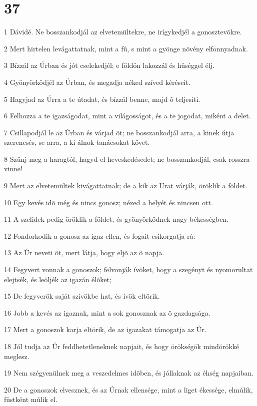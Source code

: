 \chapter{37}

\par 1 Dávidé. Ne bosszankodjál az elvetemültekre, ne irígykedjél a gonosztevõkre.
\par 2 Mert hirtelen levágattatnak, mint a fû, s mint a gyönge növény elfonnyadnak.
\par 3 Bízzál az Úrban és jót cselekedjél; e földön lakozzál és hûséggel élj.
\par 4 Gyönyörködjél az Úrban, és megadja néked szíved kéréseit.
\par 5 Hagyjad az Úrra a te útadat, és bízzál benne, majd õ teljesíti.
\par 6 Felhozza a te igazságodat, mint a világosságot, és a te jogodat, miként a delet.
\par 7 Csillapodjál le az Úrban és várjad õt; ne bosszankodjál arra, a kinek útja szerencsés, se arra, a ki álnok tanácsokat követ.
\par 8 Szünj meg a haragtól, hagyd el heveskedésedet; ne bosszankodjál, csak rosszra vinne!
\par 9 Mert az elvetemültek kivágattatnak; de a kik az Urat várják, öröklik a földet.
\par 10 Egy kevés idõ még és nincs gonosz; nézed a helyét és nincsen ott.
\par 11 A szelidek pedig öröklik a földet, és gyönyörködnek nagy békességben.
\par 12 Fondorkodik a gonosz az igaz ellen, és fogait csikorgatja rá:
\par 13 Az Úr neveti õt, mert látja, hogy eljõ az õ napja.
\par 14 Fegyvert vonnak a gonoszok; felvonják ívöket, hogy a szegényt és nyomorultat elejtsék, és leöljék az igazán élõket;
\par 15 De fegyverök saját szívökbe hat, és ívök eltörik.
\par 16 Jobb a kevés az igaznak, mint a sok gonosznak az õ gazdagsága.
\par 17 Mert a gonoszok karja eltörik, de az igazakat támogatja az Úr.
\par 18 Jól tudja az Úr feddhetetleneknek napjait, és hogy örökségök mindörökké meglesz.
\par 19 Nem szégyenülnek meg a veszedelmes idõben, és jóllaknak az éhség napjaiban.
\par 20 De a gonoszok elvesznek, és az Úrnak ellensége, mint a liget ékessége, elmúlik, füstként múlik el.
